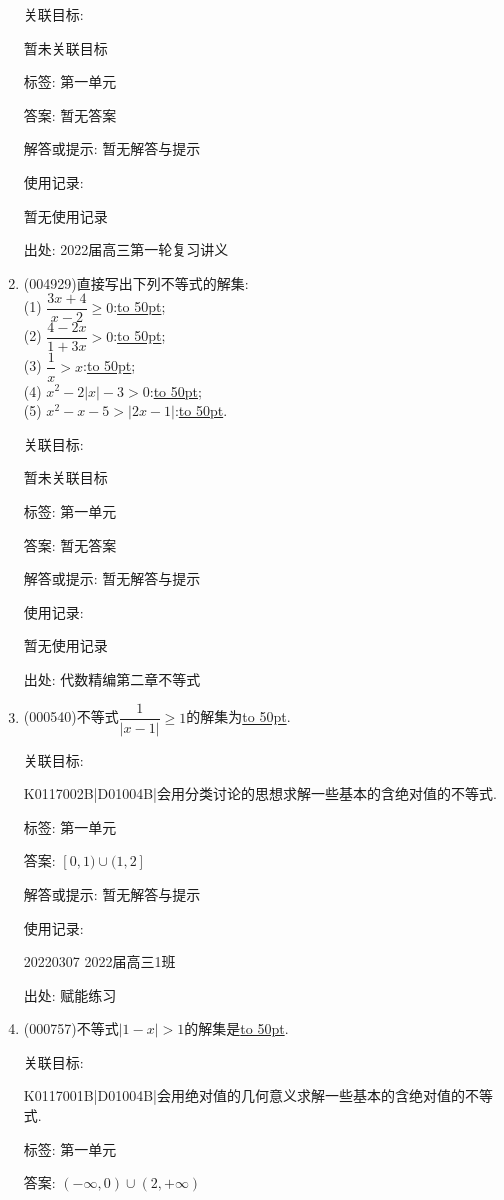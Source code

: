 \documentclass[10pt,a4paper]{article}
\newcommand{\blank}[1]{\underline{\hbox to #1pt{}}}
\begin{document}
\begin{enumerate}[1.]
关联目标:

暂未关联目标



标签: 第一单元

答案: 暂无答案

解答或提示: 暂无解答与提示

使用记录:

暂无使用记录


出处: 2022届高三第一轮复习讲义
\item { (004929)}直接写出下列不等式的解集:\\
(1) $\dfrac{3x+4}{x-2}\ge 0$:\blank{50};\\
(2) $\dfrac{4-2x}{1+3x}>0$:\blank{50};\\
(3) $\dfrac 1x>x$:\blank{50};\\	
(4) $x^2-2|x|-3>0$:\blank{50};\\
(5) $x^2-x-5>|2x-1|$:\blank{50}.


关联目标:

暂未关联目标



标签: 第一单元

答案: 暂无答案

解答或提示: 暂无解答与提示

使用记录:

暂无使用记录


出处: 代数精编第二章不等式
\item { (000540)}不等式$\dfrac1{|x-1|}\ge 1 $的解集为\blank{50}.


关联目标:

K0117002B|D01004B|会用分类讨论的思想求解一些基本的含绝对值的不等式.



标签: 第一单元

答案: $[0,1)\cup (1,2]$

解答或提示: 暂无解答与提示

使用记录:

20220307	2022届高三1班	


出处: 赋能练习
\item { (000757)}不等式$|1-x|>1$的解集是\blank{50}.


关联目标:

K0117001B|D01004B|会用绝对值的几何意义求解一些基本的含绝对值的不等式.



标签: 第一单元

答案: $(-\infty ,0)\cup (2,+\infty)$


\end{enumerate}
\end{document}
